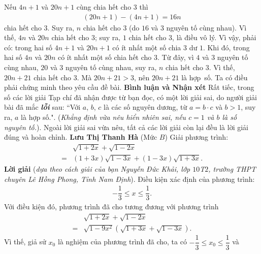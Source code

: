 \begin{multicols}{2}
	\vskip 0.05cm
	Nếu $4n + 1$ và $20n + 1$ cùng chia hết cho $3$ thì
	\begin{align*}
		(20n + 1) - (4n + 1) = 16n
	\end{align*}
	chia hết cho $3$. Suy ra, $n$ chia hết cho $3$ (do $16$ và $3$ nguyên tố cùng nhau). Vì thế, $4n$ và $20n$ chia hết cho $3$; suy ra, $1$ chia hết cho $3$, là điều vô lý. Vì vậy, phải có: trong hai số $4n + 1$ và $20n + 1$ có ít nhất một số chia $3$ dư $1$. Khi đó, trong hai số $4n$ và $20n$ có ít nhất một số chia hết cho $3$. Từ đây, vì $4$ và $3$ nguyên tố cùng nhau, $20$ và $3$ nguyên tố cùng nhau, suy ra, $n$ chia hết cho $3$. Vì thế, $20n + 21$ chia hết cho $3$. Mà $20n + 21 > 3$, nên $20n + 21$ là hợp~số.
	\vskip 0.05cm
	Ta có điều phải chứng minh theo yêu cầu đề bài.
	\vskip 0.05cm
	\textbf{\color{thachthuctoanhoc}Bình luận và Nhận xét}
	\vskip 0.05cm
	Rất tiếc, trong số các lời giải Tạp chí đã nhận được từ bạn đọc, có một lời giải sai, do người giải bài đã mắc \textbf{\color{thachthuctoanhoc}\textit{lỗi}} sau: ``Với $a$, $b$, $c$ là các số nguyên dương, từ  $a = b \cdot c$ và $b > 1$, suy ra, $a$ là hợp số.". (\textit{Khẳng định vừa nêu hiển nhiên sai, nếu $c = 1$ và $b$ là số nguyên tố.}). Ngoài lời giải sai vừa nêu, tất cả các lời giải còn lại đều là lời giải đúng và hoàn chỉnh.
	\vskip 0.05cm
	\hfill	\textbf{\color{thachthuctoanhoc}Lưu Thị Thanh Hà}
	\vskip 0.05cm
	{}
	(Mức $B$) Giải phương trình:
	\begin{align*}
		&\sqrt {1 + 2x}  + \sqrt {1 - 2x}  \\
		= &\left( {1 + 3x} \right)\sqrt {1 - 3x}  + \left( {1 - 3x} \right)\sqrt {1 + 3x} .
	\end{align*}
	\textbf{\color{thachthuctoanhoc}Lời giải} (\textit{dựa theo cách giải của bạn Nguyễn Đức Khải, lớp $10$T$2$, trường THPT chuyên Lê Hồng Phong, Tỉnh Nam Định}).
	\vskip 0.05cm
	Điều kiện xác định của phương trình:
	\begin{align*}
		-\dfrac{1}{3} \le x \le \dfrac{1}{3}.
	\end{align*}
	Với điều kiện đó, phương trình đã cho tương đương với phương trình
	\begin{align*}
		&\sqrt {1 + 2x}  + \sqrt {1 - 2x}  \\
		= &\sqrt {1 - 9{x^2}} \left( {\sqrt {1 + 3x}  + \sqrt {1 - 3x} } \right).
	\end{align*}
	Vì thế, giả sử $x_0$  là nghiệm của phương trình đã cho, ta có $ - \dfrac{1}{3} \le {x_0} \le \dfrac{1}{3}$  và
	\begin{align*}

\end{align*}
\end{multicols}
